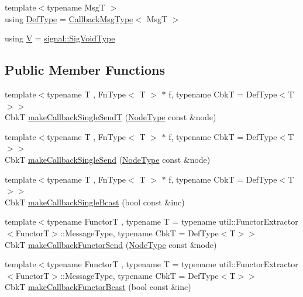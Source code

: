 \begin{DoxyCompactItemize}
\item 
{\footnotesize template$<$typename MsgT $>$ }\\using \hyperlink{structvt_1_1pipe_1_1_pipe_manager_t_l_a5f78dde989930cf645a8bd67301740a7}{Def\+Type} = \hyperlink{structvt_1_1pipe_1_1_pipe_manager_t_l_af6fc2c17f1729fa06450441b0ee81cb1}{Callback\+Msg\+Type}$<$ MsgT $>$
\item 
using \hyperlink{structvt_1_1pipe_1_1_pipe_manager_t_l_a8d394521df58abfd90c1d81c998f22e3}{V} = \hyperlink{namespacevt_1_1pipe_1_1signal_acbe257d1ae44f20fa9fd9b6ed3057caf}{signal\+::\+Sig\+Void\+Type}
\end{DoxyCompactItemize}
\subsection*{Public Member Functions}
\begin{DoxyCompactItemize}
\item 
{\footnotesize template$<$typename T , Fn\+Type$<$ T $>$ $\ast$ f, typename CbkT  = Def\+Type$<$\+T$>$$>$ }\\CbkT \hyperlink{structvt_1_1pipe_1_1_pipe_manager_t_l_aff917693da92fdfb5b275c7cf61e5e8b}{make\+Callback\+Single\+SendT} (\hyperlink{namespacevt_a866da9d0efc19c0a1ce79e9e492f47e2}{Node\+Type} const \&node)
\item 
{\footnotesize template$<$typename T , Fn\+Type$<$ T $>$ $\ast$ f, typename CbkT  = Def\+Type$<$\+T$>$$>$ }\\CbkT \hyperlink{structvt_1_1pipe_1_1_pipe_manager_t_l_a8776a3e14cce177c3b31aed347177750}{make\+Callback\+Single\+Send} (\hyperlink{namespacevt_a866da9d0efc19c0a1ce79e9e492f47e2}{Node\+Type} const \&node)
\item 
{\footnotesize template$<$typename T , Fn\+Type$<$ T $>$ $\ast$ f, typename CbkT  = Def\+Type$<$\+T$>$$>$ }\\CbkT \hyperlink{structvt_1_1pipe_1_1_pipe_manager_t_l_a1c5332868e96ae95eaa99bf7d755a6a1}{make\+Callback\+Single\+Bcast} (bool const \&inc)
\item 
{\footnotesize template$<$typename FunctorT , typename T  = typename util\+::\+Functor\+Extractor$<$\+Functor\+T$>$\+::\+Message\+Type, typename CbkT  = Def\+Type$<$\+T$>$$>$ }\\CbkT \hyperlink{structvt_1_1pipe_1_1_pipe_manager_t_l_a446f98d0a74d66539a411e1d41caa505}{make\+Callback\+Functor\+Send} (\hyperlink{namespacevt_a866da9d0efc19c0a1ce79e9e492f47e2}{Node\+Type} const \&node)
\item 
{\footnotesize template$<$typename FunctorT , typename T  = typename util\+::\+Functor\+Extractor$<$\+Functor\+T$>$\+::\+Message\+Type, typename CbkT  = Def\+Type$<$\+T$>$$>$ }\\CbkT \hyperlink{structvt_1_1pipe_1_1_pipe_manager_t_l_ac5ba44c5897bd1ecfb6f360f5da0a703}{make\+Callback\+Functor\+Bcast} (bool const \&inc)

\end{DoxyCompactItemize}
